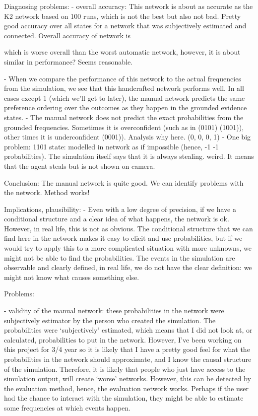 \documentclass[12pt]{article}
\begin{document}
\newpage


Diagnosing problems:
- overall accuracy: This network is about as accurate as the K2 network based on 100 runs, which is not the best but also not bad. Pretty good accuracy over all states for a network that was subjectively estimated and connected. Overall accuracy of network is


which is worse overall than the worst automatic network, however, it is about similar in performance? Seems reasonable.

- When we compare the performance of this network to the actual frequencies from the simulation, we see that this handcrafted network performs well. In all cases except 1 (which we'll get to later), the manual network  predicts the same preference ordering over the outcomes as they happen in the grounded evidence states.
- The manual network does not predict the exact probabilities from the grounded frequencies. Sometimes it is overconfident (such as in (0101) (1001)), other times it is underconfident (0001)). Analysis why here. (0, 0, 0, 1)
- One big problem: 1101 state: modelled in network as if impossible (hence, -1 -1 probabilities). The simulation itself says that it is always stealing. weird. It means that the agent steals but is not shown on camera.

Conclusion:
The manual network is quite good. We can identify problems with the network. Method works! 

Implications, plausibility:
- Even with a low degree of precision, if we have a conditional structure and a clear idea of what happens, the network is ok. However, in real life, this is not as obvious.  The conditional structure that we can find here in the network makes it easy to elicit and use probabilities, but if we would try to apply this to a more complicated situation with more unknowns, we might not be able to find the probabilities. The events in the simulation are observable and clearly defined, in real life, we do not have the clear definition: we might not know what causes something else. 

Problems:

-  validity of the manual network: these probabilities in the network were subjectively estimator by the person who created the simulation. The probabilities were `subjectively' estimated, which means that I did not look at, or calculated, probabilities to put in the network. However, I've been working on this project for 3/4 year so it is likely that I have a pretty good feel for what the probabilities in the network should approximate, and I know the causal structure of the simulation. Therefore, it is likely that people who just have access to the simulation output, will create `worse' networks. However, this can be detected by the evaluation method, hence, the evaluation network works. Perhaps if the user had the chance to interact with the simulation, they might be able to estimate some frequencies at which events happen. 
\end{document}
